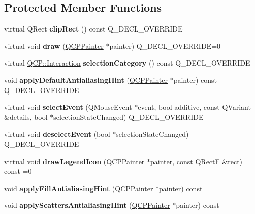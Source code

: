 \subsection*{Protected Member Functions}
\begin{DoxyCompactItemize}
\item 
\mbox{\label{classQCPAbstractPlottable_a635cee3effc07ad421414c76fd83548c}} 
virtual Q\+Rect {\bfseries clip\+Rect} () const Q\+\_\+\+D\+E\+C\+L\+\_\+\+O\+V\+E\+R\+R\+I\+DE
\item 
\mbox{\label{classQCPAbstractPlottable_a453f676a5cee7bf846c5f0fa05ea84b3}} 
virtual void {\bfseries draw} (\hyperlink{classQCPPainter}{Q\+C\+P\+Painter} $\ast$painter) Q\+\_\+\+D\+E\+C\+L\+\_\+\+O\+V\+E\+R\+R\+I\+DE=0
\item 
\mbox{\label{classQCPAbstractPlottable_af80ad8531642e786b6f4fad551c203c4}} 
virtual \hyperlink{namespaceQCP_a2ad6bb6281c7c2d593d4277b44c2b037}{Q\+C\+P\+::\+Interaction} {\bfseries selection\+Category} () const Q\+\_\+\+D\+E\+C\+L\+\_\+\+O\+V\+E\+R\+R\+I\+DE
\item 
\mbox{\label{classQCPAbstractPlottable_ac032077fb0db93d6faa3273d02363398}} 
void {\bfseries apply\+Default\+Antialiasing\+Hint} (\hyperlink{classQCPPainter}{Q\+C\+P\+Painter} $\ast$painter) const Q\+\_\+\+D\+E\+C\+L\+\_\+\+O\+V\+E\+R\+R\+I\+DE
\item 
\mbox{\label{classQCPAbstractPlottable_a2d488568cf16600dd81fa23d7d439829}} 
virtual void {\bfseries select\+Event} (Q\+Mouse\+Event $\ast$event, bool additive, const Q\+Variant \&details, bool $\ast$selection\+State\+Changed) Q\+\_\+\+D\+E\+C\+L\+\_\+\+O\+V\+E\+R\+R\+I\+DE
\item 
\mbox{\label{classQCPAbstractPlottable_a9b104d9da4f38f934363945c313bf82e}} 
virtual void {\bfseries deselect\+Event} (bool $\ast$selection\+State\+Changed) Q\+\_\+\+D\+E\+C\+L\+\_\+\+O\+V\+E\+R\+R\+I\+DE
\item 
\mbox{\label{classQCPAbstractPlottable_a9a450783fd9ed539e589999fd390cdf7}} 
virtual void {\bfseries draw\+Legend\+Icon} (\hyperlink{classQCPPainter}{Q\+C\+P\+Painter} $\ast$painter, const Q\+RectF \&rect) const =0
\item 
\mbox{\label{classQCPAbstractPlottable_a8d06a59ea23324cce6330ebf2262c0ed}} 
void {\bfseries apply\+Fill\+Antialiasing\+Hint} (\hyperlink{classQCPPainter}{Q\+C\+P\+Painter} $\ast$painter) const
\item 
\mbox{\label{classQCPAbstractPlottable_ac95f26b15a1e5d9c7bd2c0a46d760fc9}} 
void {\bfseries apply\+Scatters\+Antialiasing\+Hint} (\hyperlink{classQCPPainter}{Q\+C\+P\+Painter} $\ast$painter) const
\end{DoxyCompactItemize}
